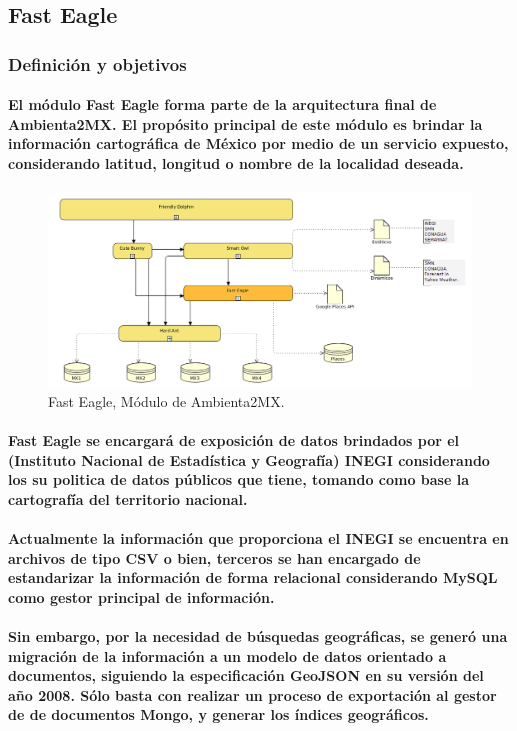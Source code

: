 \subsection{Fast Eagle}
    \subsubsection{Definición y objetivos}
      \paragraph{El módulo Fast Eagle forma parte de la arquitectura final de Ambienta2MX. El propósito principal de este módulo es brindar la información cartográfica de México por medio de un servicio expuesto, considerando latitud, longitud o nombre de la localidad deseada.}
      \begin{figure}[h!]
          \centering
            \includegraphics[width=\textwidth]{./images/DiagramaAmbienta2MX_FastEagle.png}
          \caption{Fast Eagle, Módulo de Ambienta2MX.}
      \end{figure}
      \paragraph{Fast Eagle se encargará de exposición de datos brindados por el (Instituto Nacional de Estadística y Geografía) INEGI considerando los su politica de datos públicos que tiene, tomando como base la cartografía del territorio nacional.}
      \paragraph{Actualmente la información que proporciona el INEGI se encuentra en archivos de tipo CSV o bien, terceros se han encargado de estandarizar la información de forma relacional considerando MySQL como gestor principal de información.}
      \paragraph{Sin embargo, por la necesidad de búsquedas geográficas, se generó una migración de la información a un modelo de datos orientado a documentos, siguiendo la especificación GeoJSON en su versión del año 2008. Sólo basta con realizar un proceso de exportación al gestor de de documentos Mongo, y generar los índices geográficos. \cite{35}}
